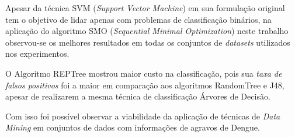 \documentclass[
	12pt,				%
	openright,			%
	oneside,	
	a4paper,				%
	english,				%
	brazil				%
]{abntex2/abntex2} %
\begin{document}
	Apesar da técnica SVM (\textit{Support Vector Machine}) em sua formulação original tem o objetivo de lidar apenas com problemas de classificação binários, na aplicação do algoritmo SMO (\textit{Sequential Minimal Optimization}) neste trabalho observou-se os melhores resultados em todas os conjuntos de \textit{datasets} utilizados nos experimentos.
	
	O Algoritmo REPTree mostrou maior custo na classificação, pois sua \textit{taxa de falsos positivos} foi a maior em comparação aos algoritmos RandomTree e J48, apesar de realizarem a mesma técnica de classificação Árvores de Decisão.
	
	Com isso foi possível observar a viabilidade da aplicação de técnicas de \textit{Data Mining} em conjuntos de dados com informações de agravos de Dengue.
	

	
	
\end{document}
